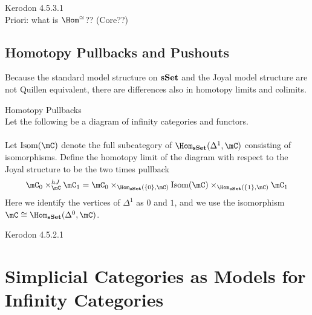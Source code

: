\documentclass[a4paper]{article}
\begin{document}
Kerodon 4.5.3.1\\

Priori: what is $\Hom^\simeq$?? (Core??)

\subsection{Homotopy Pullbacks and Pushouts}
Because the standard model structure on $\bold{sSet}$ and the Joyal model structure are not Quillen equivalent, there are differences also in homotopy limits and colimits. 

\begin{defn}{Homotopy Pullbacks}{}\\ Let the following be a diagram of infinity categories and functors. \\
\\
Let $\text{Isom}(\mC)$ denote the full subcategory of $\Hom_\bold{sSet}(\Delta^1,\mC)$ consisting of isomorphisms. Define the homotopy limit of the diagram with respect to the Joyal structure to be the two times pullback $$\mC_0\times_\mC^{hJ}\mC_1=\mC_0\times_{\Hom_\bold{sSet}(\{0\},\mC)}\text{Isom}(\mC)\times_{\Hom_\bold{sSet}(\{1\},\mC)}\mC_1$$ Here we identify the vertices of $\Delta^1$ as $0$ and $1$, and we use the isomorphism $\mC\cong\Hom_\bold{sSet}(\Delta^0,\mC)$. 
\end{defn}

Kerodon 4.5.2.1

\pagebreak
\section{Simplicial Categories as Models for Infinity Categories}
\end{document}

